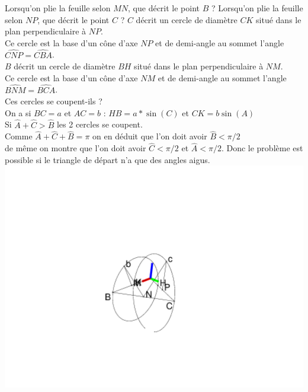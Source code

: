 \documentclass[a4paper,11pt]{book}
\begin{document}
Lorsqu'on plie la feuille selon $MN$, que d\'ecrit le point $B$ ?
Lorsqu'on plie la feuille selon $NP$, que d\'ecrit le point $C$ ?
$C$ d\'ecrit un cercle de diam\`etre $CK$ situ\'e dans le plan perpendiculaire 
\`a $NP$.\\
Ce cercle est la base d'un c\^one d'axe $NP$ et de demi-angle au sommet l'angle
$\widehat{CNP}=\widehat{CBA}$.\\
$B$ d\'ecrit un cercle de diam\`etre $BH$ situ\'e dans le plan perpendiculaire 
\`a $NM$.\\
Ce cercle est la base d'un c\^one d'axe $NM$ et de demi-angle au sommet l'angle
$\widehat{BNM}=\widehat{BCA}$.\\
Ces cercles se coupent-ils ?\\
On a si $BC=a$ et $AC=b$ : $HB=a*\sin(C)$ et $CK=b\sin(A)$\\
Si $\widehat A +\widehat C >\widehat B$ les 2 cercles se coupent.\\
Comme $\widehat A +\widehat C +\widehat B=\pi$ on en d\'eduit que l'on doit 
avoir $\widehat B <\pi/2$\\
de m\^eme on montre que  l'on doit 
avoir $\widehat C <\pi/2$ et $\widehat A <\pi/2$.
Donc le probl\`eme est possible si le triangle de d\'epart n'a que des angles 
aigus.\\
\includegraphics[width=\textwidth]{troisgeo1}
\end{document}
